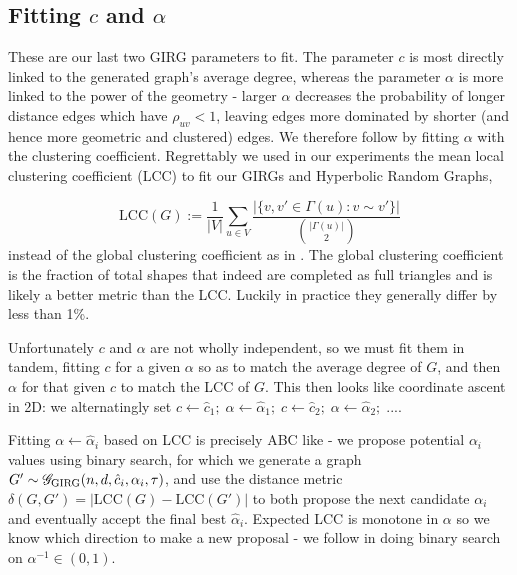 \subsection{Fitting $c$ and $\alpha$}
These are our last two GIRG parameters to fit.
The parameter $c$ is most directly linked to the generated graph's average degree, whereas the parameter $\alpha$ is more linked to the power of the geometry - larger $\alpha$ decreases the probability of longer distance edges which have $\rho_{uv} < 1$, leaving edges more dominated by shorter (and hence more geometric and clustered) edges. We therefore follow \cite{blasius2018towards} by fitting $\alpha$ with the clustering coefficient. Regrettably we used in our experiments the mean local clustering coefficient (LCC) to fit our GIRGs and Hyperbolic Random Graphs, 

\begin{equation}
    \mathrm{LCC}(G) := \frac{1}{|V|} \sum_{u \in V} 
    \frac{| \{ v, v' \in \Gamma(u): v \sim v'\} |}{{|\Gamma(u)| \choose 2}}
\end{equation}
instead of the global clustering coefficient as in \cite{blasius2018towards}. The global clustering coefficient is the fraction of total  shapes that indeed are completed as full triangles and is likely a better metric than the LCC. Luckily in practice they generally differ by less than 1\%.

Unfortunately $c$ and $\alpha$ are not wholly independent, so we must fit them in tandem, fitting $c$ for a given $\alpha$ so as to match the average degree of $G$, and then $\alpha$ for that given $c$ to match the LCC of $G$. This then looks like coordinate ascent in 2D: we alternatingly set $c \gets \hat{c}_1;\; \alpha \gets \hat{\alpha}_1;\; c \gets \hat{c}_2;\; \alpha \gets \hat{\alpha}_2;\; ...$.

Fitting $\alpha \gets \hat{\alpha}_i$ based on LCC is precisely ABC like - we propose potential $\alpha_i$ values using binary search, for which we generate a graph $G' \sim \mathscr{G}_{\mathrm{GIRG}}(n, d, \hat{c}_i, \alpha_i, \tau)$, and use the distance metric $\delta(G, G') = |\mathrm{LCC}(G) - \mathrm{LCC}(G')|$ to both propose the next candidate $\alpha_i$ and eventually accept the final best $\hat{\alpha}_i$. Expected LCC is monotone in $\alpha$ so we know which direction to make a new proposal - we follow \cite{blasius2018towards} in doing binary search on $\alpha^{-1} \in (0, 1)$.

